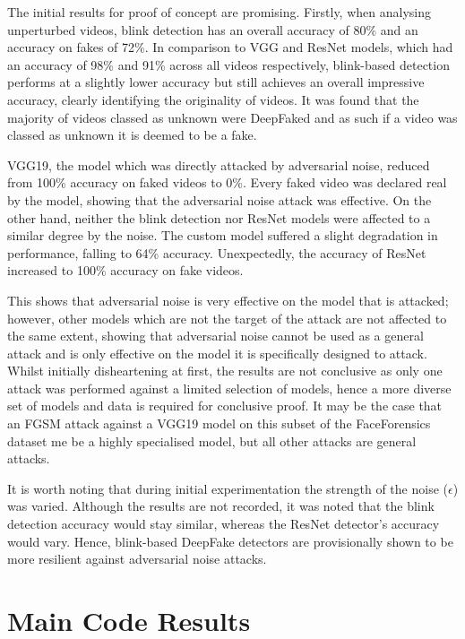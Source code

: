 The initial results for proof of concept are promising. Firstly, when analysing unperturbed videos, blink detection has an overall accuracy of 80\% and an accuracy on fakes of 72\%. In comparison to VGG and ResNet models, which had an accuracy of 98\% and 91\% across all videos respectively, blink-based detection performs at a slightly lower accuracy but still achieves an overall impressive accuracy, clearly identifying the originality of videos. It was found that the majority of videos classed as unknown were DeepFaked and as such if a video was classed as unknown it is deemed to be a fake.

VGG19, the model which was directly attacked by adversarial noise, reduced from 100\% accuracy on faked videos to 0\%. Every faked video was declared real by the model, showing that the adversarial noise attack was effective. On the other hand, neither the blink detection nor ResNet models were affected to a similar degree by the noise. The custom model suffered a slight degradation in performance, falling to 64\% accuracy. Unexpectedly, the accuracy of ResNet increased to 100\% accuracy on fake videos.

This shows that adversarial noise is very effective on the model that is attacked; however, other models which are not the target of the attack are not affected to the same extent, showing that adversarial noise cannot be used as a general attack and is only effective on the model it is specifically designed to attack. Whilst initially disheartening at first, the results are not conclusive as only one attack was performed against a limited selection of models, hence a more diverse set of models and data is required for conclusive proof. It may be the case that an FGSM attack against a VGG19 model on this subset of the FaceForensics dataset me be a highly specialised model, but all other attacks are general attacks.

It is worth noting that during initial experimentation the strength of the noise ($\epsilon$) was varied. Although the results are not recorded, it was noted that the blink detection accuracy would stay similar, whereas the ResNet detector's accuracy would vary. Hence, blink-based DeepFake detectors are provisionally shown to be more resilient against adversarial noise attacks.

\section{Main Code Results}

